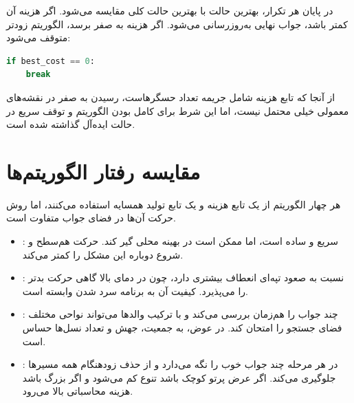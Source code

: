 \documentclass[10.5pt]{exam}
\begin{document}
در پایان هر تکرار، بهترین حالت با بهترین حالت کلی مقایسه می‌شود. اگر هزینه آن کمتر باشد، جواب نهایی به‌روزرسانی می‌شود. اگر هزینه به صفر برسد، الگوریتم زودتر متوقف می‌شود:

\begin{latin}
\begin{lstlisting}[language=Python]
if best_cost == 0:
    break
\end{lstlisting}
\end{latin}

از آنجا که تابع هزینه شامل جریمه تعداد حسگرهاست، رسیدن به صفر در نقشه‌های معمولی خیلی محتمل نیست، اما این شرط برای کامل بودن الگوریتم و توقف سریع در حالت ایده‌آل گذاشته شده است.

\section{مقایسه رفتار الگوریتم‌ها}
هر چهار الگوریتم از یک تابع هزینه و یک تابع تولید همسایه استفاده می‌کنند، اما روش حرکت آن‌ها در فضای جواب متفاوت است.

\begin{itemize}
    \item {}: سریع و ساده است، اما ممکن است در بهینه محلی گیر کند. حرکت هم‌سطح و شروع دوباره این مشکل را کمتر می‌کند.
    \item {}: نسبت به صعود تپه‌ای انعطاف بیشتری دارد، چون در دمای بالا گاهی حرکت بدتر را می‌پذیرد. کیفیت آن به برنامه سرد شدن وابسته است.
    \item {}: چند جواب را هم‌زمان بررسی می‌کند و با ترکیب والدها می‌تواند نواحی مختلف فضای جستجو را امتحان کند. در عوض، به جمعیت، جهش و تعداد نسل‌ها حساس است.
    \item {}: در هر مرحله چند جواب خوب را نگه می‌دارد و از حذف زودهنگام همه مسیرها جلوگیری می‌کند. اگر عرض پرتو کوچک باشد تنوع کم می‌شود و اگر بزرگ باشد هزینه محاسباتی بالا می‌رود.
\end{itemize}
\end{document}
